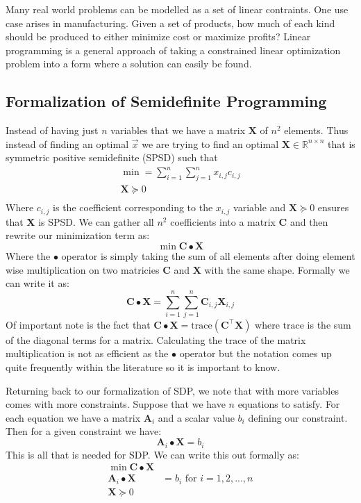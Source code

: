 \documentclass{article}
\begin{document}
Many real world problems can be modelled as a set of linear contraints. One use case arises in manufacturing.
Given a set of products, how much of each kind should be produced to either minimize cost or maximize profits?
Linear programming is a general approach of taking a constrained linear optimization problem into a form where a solution can easily be found.

\subsection{Formalization of Semidefinite Programming}
Instead of having just \( n \) variables that we have a matrix \( \mathbf{X} \) of \( n^2 \) elements. Thus instead of finding an optimal \( \vec{x} \) we are trying to find an optimal \( \mathbf{X} \in \mathbb{R}^{n \times n} \) that is symmetric positive semidefinite (SPSD) such that
\begin{gather*}
\min = \sum_{i = 1}^n \sum_{j = 1}^n x_{i, j} c_{i , j} \\
\mathbf{X} \succeq 0 \\
\end{gather*}
Where \( c_{i, j} \) is the coefficient corresponding to the \( x_{i, j} \) variable and \( \mathbf{X} \succeq 0 \) ensures that \( \mathbf{X} \) is SPSD. We can gather all \( n^2 \) coefficients into a matrix \( \mathbf{C} \) and then rewrite our minimization term as:
\[
\min \mathbf{C} \bullet \mathbf{X}
\]
Where the \( \bullet \) operator is simply taking the sum of all elements after doing element wise multiplication on two matricies \( \mathbf{C} \) and \( \mathbf{X} \) with the same shape. Formally we can write it as:
\[
  \mathbf{C} \bullet \mathbf{X} = \sum_{i = 1}^n \sum_{j = 1}^n \mathbf{C}_{i, j} \mathbf{X}_{i, j}
\]
Of important note is the fact that \( \mathbf{C} \bullet \mathbf{X} = \text{trace}(\mathbf{C}^\top \mathbf{X}) \) where \( \text{trace} \) is the sum of the diagonal terms for a matrix. Calculating the \( \text{trace} \) of the matrix multiplication is not as efficient as the \( \bullet \) operator but the notation comes up quite frequently within the literature so it is important to know.

Returning back to our formalization of SDP, we note that with more variables comes with more constraints. Suppose that we have \( n \) equations to satisfy. For each equation we have a matrix \( \mathbf{A}_i \) and a scalar value \( b_i \) defining our constraint. Then for a given constraint we have:
\[
\mathbf{A}_i \bullet \mathbf{X} = b_i
\]
This is all that is needed for SDP. We can write this out formally as:
\begin{align*}
  \min \mathbf{C} \bullet \mathbf{X} \\
  \mathbf{A}_i \bullet \mathbf{X} &= b_i  \text{   for } i = 1, 2, ..., n\\
  \mathbf{X} \succeq 0 \\
\end{align*}
\end{document}

